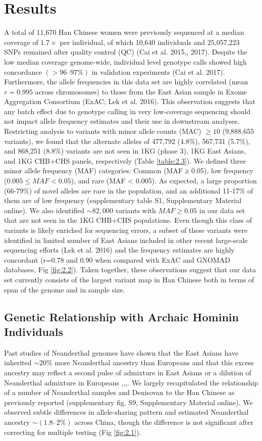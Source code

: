 \section{Results}
A total of 11,670 Han Chinese women were previously sequenced at a median coverage of $1.7\times$ per individual, of which 10,640 individuals and 25,057,223 SNPs remained after quality control (QC) (Cai et al. 2015,, 2017). Despite the low median coverage genome-wide, individual level genotype calls showed high concordance $(>96–97\%)$ in validation experiments (Cai et al. 2017). Furthermore, the allele frequencies in this data set are highly correlated (mean $r=0.995$ across chromosomes) to those from the East Asian sample in Exome Aggregation Consortium (ExAC; Lek et al. 2016). This observation suggests that any batch effect due to genotype calling in very low-coverage sequencing should not impact allele frequency estimates and their use in downstream analyses.
Restricting analysis to variants with minor allele counts (MAC) $\ge10$ (9,888,655 variants), we found that the alternate alleles of 477,792 (4.8\%), 567,731 (5.7\%), and 868,251 (8.8\%) variants are not seen in 1KG (phase 3), 1KG East Asians, and 1KG CHB+CHS panels, respectively (Table \ref{table:2.3}). We defined three minor allele frequency (MAF) categories: Common (MAF ≥ 0.05), low frequency ($0.005\le MAF < 0.05$), and rare (MAF < 0.005). As expected, a large proportion (66-79\%) of novel alleles are rare in the population, and an additional 11-17\% of them are of low frequency (supplementary table S1, Supplementary Material online). We also identified $\sim82,000$ variants with $MAF \ge 0.05$ in our data set that are not seen in the 1KG CHB+CHS populations. Even though this class of variants is likely enriched for sequencing errors, a subset of these variants were identified in limited number of East Asians included in other recent large-scale sequencing efforts (Lek et al. 2016) and the frequency estimates are highly concordant (r=0.78 and 0.90 when compared with ExAC and GNOMAD databases, Fig \ref{fig:2.2}). Taken together, these observations suggest that our data set currently consists of the largest variant map in Han Chinese both in terms of span of the genome and in sample size.
\subsection{Genetic Relationship with Archaic Hominin Individuals}
Past studies of Neanderthal genomes have shown that the East Asians have inherited $\sim20\%$ more Neanderthal ancestry than Europeans and that this excess ancestry may reflect a second pulse of admixture in East Asians or a dilution of Neanderthal admixture in Europeans \cite{prfer2014complete},\cite{sankararaman2014genomic},\cite{vernot2014resurrecting},\cite{kim2015selection}. We largely recapitulated the relationship of a number of Neanderthal samples and Denisovan to the Han Chinese as previously reported (supplementary fig. S9, Supplementary Material online). We observed subtle differences in allele-sharing pattern and estimated Neanderthal ancestry $\sim(1.8–2\%)$ across China, though the difference is not significant after correcting for multiple testing (Fig \ref{fig:2.1}).
